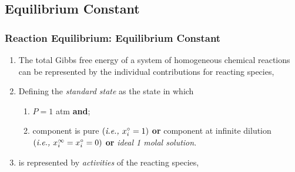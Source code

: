 \documentclass[10pt,compress,handout,unknownkeysallowed]{beamer}
\begin{document}
\subsection{Equilibrium Constant}

\begin{frame}
  \frametitle{Reaction Equilibrium: Equilibrium Constant}
      \begin{enumerate} 
        \item<1-> The total Gibbs free energy of a system of homogeneous chemical reactions can be represented by the individual contributions for reacting species,
        \item<2-> Defining the {\it standard state} \blue{$\left(^{\circ}\right)$} as the state in which
            \begin{enumerate}
               \item<2-> $P=1$ atm {\bf and};
               \item<2-> component is pure $\left(\text{{\it i.e., }} x_{i}^{\circ}=1\right)$ {\bf or } component at infinite dilution $\left(\text{{\it i.e., }} x_{i}^{\infty}=x_{i}^{\circ}=0\right)$ {\bf or} {\it ideal 1 molal solution}.
            \end{enumerate}
         \item<3->  is represented by {\it activities} of the reacting species, \ie

      \end{enumerate}
\end{frame}
\end{document}
